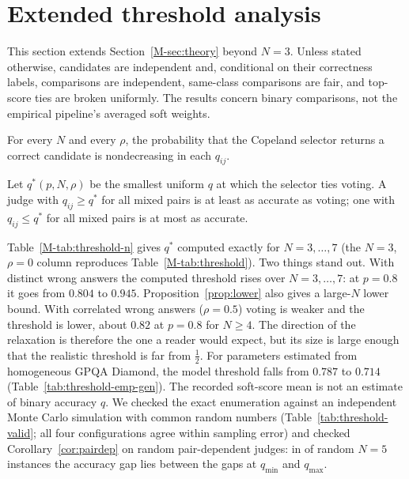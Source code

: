 \section{Extended threshold analysis}
\label{sec:s-threshold}

This section extends Section~\ref{M-sec:theory} beyond $N=3$. Unless stated
otherwise, candidates are independent and, conditional on their correctness
labels, comparisons are independent, same-class comparisons are fair, and
top-score ties are broken uniformly. The results concern binary comparisons,
not the empirical pipeline's averaged soft weights.

\begin{lemma}
\label{lem:monotone}
For every $N$ and every $\rho$, the probability that the Copeland selector
returns a correct candidate is nondecreasing in each $q_{ij}$.
\end{lemma}

\begin{corollary}
\label{cor:pairdep}
Let $q^{*}(p,N,\rho)$ be the smallest uniform $q$ at which the selector ties
voting. A judge with $q_{ij}\ge q^{*}$ for all mixed pairs is at least as accurate
as voting; one with $q_{ij}\le q^{*}$ for all mixed pairs is at most as accurate.
\end{corollary}

Table~\ref{M-tab:threshold-n} gives $q^{*}$ computed exactly for $N=3,\dots,7$
(the $N=3$, $\rho=0$ column reproduces Table~\ref{M-tab:threshold}). Two things stand
out. With distinct wrong answers the computed threshold rises over $N=3,\ldots,7$:
at $p=0.8$ it goes from $0.804$ to $0.945$. Proposition~\ref{prop:lower}
also gives a large-$N$ lower bound. With correlated wrong answers ($\rho=0.5$) voting is weaker
and the threshold is lower, about $0.82$ at $p=0.8$ for $N\ge4$. The
direction of the relaxation is therefore the one a reader would expect, but its
size is large enough that the realistic threshold is far from $\tfrac12$.
For parameters estimated from homogeneous GPQA Diamond, the model threshold
falls from $0.787$ to $0.714$ (Table~\ref{tab:threshold-emp-gen}).
The recorded soft-score mean is not an estimate of binary accuracy $q$.
We checked the exact enumeration against an independent Monte Carlo
simulation with common random numbers (Table~\ref{tab:threshold-valid}; all
four configurations agree within sampling error) and checked
Corollary~\ref{cor:pairdep} on random pair-dependent judges: in
\PairDepInside{} of \PairDepTrials{} random $N=5$ instances the accuracy gap lies
between the gaps at $q_{\min}$ and $q_{\max}$.

